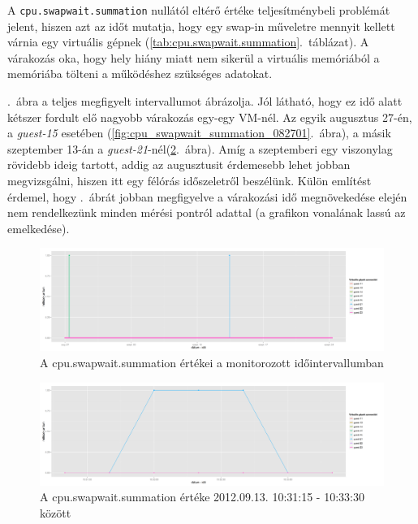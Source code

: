 \documentclass[a4paper,10pt,titlepage]{article}
\begin{document}
A \texttt{cpu.swapwait.summation} nullától eltérő értéke teljesítménybeli problémát jelent, hiszen azt az időt mutatja, hogy egy swap-in műveletre mennyit kellett várnia egy virtuális gépnek (\ref{tab:cpu.swapwait.summation}.~táblázat). A várakozás oka, hogy hely hiány miatt nem sikerül a virtuális memóriából a memóriába tölteni a működéshez szükséges adatokat.

.~ábra a teljes megfigyelt intervallumot ábrázolja. Jól látható, hogy ez idő alatt kétszer fordult elő nagyobb várakozás egy-egy VM-nél. Az egyik augusztus 27-én, a \textit{guest-15} esetében (\ref{fig:cpu_swapwait_summation_082701}.~ábra), a másik szeptember 13-án a \textit{guest-21}-nél(\ref{fig:cpu_swapwait_summation_0913}.~ábra). Amíg a szeptemberi egy viszonylag rövidebb ideig tartott, addig az augusztusit érdemesebb lehet jobban megvizsgálni, hiszen itt egy félórás időszeletről beszélünk. Külön említést érdemel, hogy .~ábrát jobban megfigyelve a várakozási idő megnövekedése elején nem rendelkezünk minden mérési pontról adattal (a grafikon vonalának lassú az emelkedése).

\begin{figure}[h!]
\centering
\includegraphics[width=1.00\textwidth]{figures/cpu_swapwait_summation-20120826230140-20120924083120.png}
\caption{A cpu.swapwait.summation értékei a monitorozott időintervallumban \label{fig:cpu_swapwait_summation}}
\end{figure}

\begin{figure}[h!]
\centering
\includegraphics[width=1.00\textwidth]{figures/cpu_swapwait_summation-20120913103115-20120913103330.png}
\caption{A cpu.swapwait.summation értéke 2012.09.13. 10:31:15 - 10:33:30 között \label{fig:cpu_swapwait_summation_0913}}
\end{figure}
\end{document}
